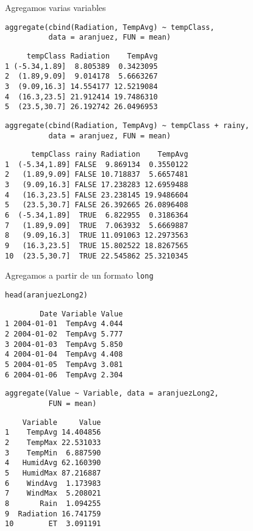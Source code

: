 \documentclass[xcolor={usenames,svgnames,dvipsnames}]{beamer}
\begin{document}
\begin{frame}[fragile,label={sec:org06157ab}]{Agregamos varias variables}
 \lstset{language=r,label= ,caption= ,captionpos=b,numbers=none}
\begin{lstlisting}
aggregate(cbind(Radiation, TempAvg) ~ tempClass,
          data = aranjuez, FUN = mean)
\end{lstlisting}

\begin{verbatim}
     tempClass Radiation    TempAvg
1 (-5.34,1.89]  8.805389  0.3423095
2  (1.89,9.09]  9.014178  5.6663267
3  (9.09,16.3] 14.554177 12.5219084
4  (16.3,23.5] 21.912414 19.7486310
5  (23.5,30.7] 26.192742 26.0496953
\end{verbatim}

\lstset{language=r,label= ,caption= ,captionpos=b,numbers=none}
\begin{lstlisting}
aggregate(cbind(Radiation, TempAvg) ~ tempClass + rainy,
          data = aranjuez, FUN = mean)
\end{lstlisting}

\begin{verbatim}
      tempClass rainy Radiation    TempAvg
1  (-5.34,1.89] FALSE  9.869134  0.3550122
2   (1.89,9.09] FALSE 10.718837  5.6657481
3   (9.09,16.3] FALSE 17.238283 12.6959488
4   (16.3,23.5] FALSE 23.238145 19.9486604
5   (23.5,30.7] FALSE 26.392665 26.0896408
6  (-5.34,1.89]  TRUE  6.822955  0.3186364
7   (1.89,9.09]  TRUE  7.063932  5.6669887
8   (9.09,16.3]  TRUE 11.091063 12.2973563
9   (16.3,23.5]  TRUE 15.802522 18.8267565
10  (23.5,30.7]  TRUE 22.545862 25.3210345
\end{verbatim}
\end{frame}


\begin{frame}[fragile,label={sec:orga04aa15}]{Agregamos a partir de un formato \texttt{long}}
 \lstset{language=r,label= ,caption= ,captionpos=b,numbers=none}
\begin{lstlisting}
head(aranjuezLong2)
\end{lstlisting}

\begin{verbatim}
        Date Variable Value
1 2004-01-01  TempAvg 4.044
2 2004-01-02  TempAvg 5.777
3 2004-01-03  TempAvg 5.850
4 2004-01-04  TempAvg 4.408
5 2004-01-05  TempAvg 3.081
6 2004-01-06  TempAvg 2.304
\end{verbatim}

\lstset{language=r,label= ,caption= ,captionpos=b,numbers=none}
\begin{lstlisting}
aggregate(Value ~ Variable, data = aranjuezLong2,
          FUN = mean)
\end{lstlisting}

\begin{verbatim}
    Variable     Value
1    TempAvg 14.404856
2    TempMax 22.531033
3    TempMin  6.887590
4   HumidAvg 62.160390
5   HumidMax 87.216887
6    WindAvg  1.173983
7    WindMax  5.208021
8       Rain  1.094255
9  Radiation 16.741759
10        ET  3.091191
\end{verbatim}
\end{frame}
\end{document}
